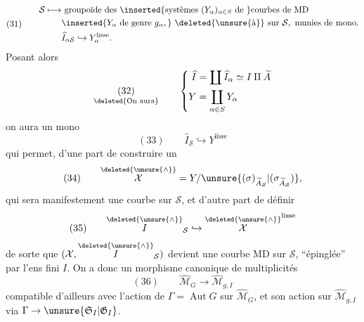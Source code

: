 \[
(31)\qquad\begin{aligned}
\mathcal S\longmapsto&\ \text{groupoïde des }\inserted{\text{systèmes }(Y_\alpha)_{\alpha\in S}\text{ de }}\text{courbes de MD}\\
&\inserted{Y_\alpha\text{ de genre }g_\alpha,}\ \text{\deleted{\unsure{à}} sur }\mathcal S,\text{ munies de mono.}\\
&\widehat I_{\alpha\mathcal S}\hookrightarrow Y_\alpha^{\text{lisse}}.
\end{aligned}
\]
Posant alors
\[
\underset{\text{\deleted{On aura}}}{(32)}\qquad\left\{\begin{aligned}
\widehat I&=\coprod\widehat I_\alpha\simeq I\amalg\widetilde A\\
Y&=\coprod_{\alpha\in S}Y_\alpha
\end{aligned}\right.
\]
on aura un mono
\[
(33)\qquad\widehat I_{\mathcal S}\hookrightarrow Y^{\text{lisse}}
\]
qui permet, d'une part de construire un
\[
(34)\qquad\overset{\deleted{\unsure{\wedge}}}{\mathcal X}=Y/\unsure{(\sigma)_{\widetilde A_{\mathcal S}}|(\sigma_{\widetilde A_{\mathcal S}})},
\]
qui sera manifestement une courbe  sur $\mathcal S$, et d'autre part de définir
\[
(35)\qquad\overset{\deleted{\unsure{\wedge}}}{I}_{\mathcal S}\hookrightarrow\overset{\deleted{\unsure{\wedge}}}{\mathcal X}^{\text{lisse}}
\]
de sorte que $(\mathcal X,\overset{\deleted{\unsure{\wedge}}}{I}_{\mathcal S})$ devient une courbe  MD sur $\mathcal S$, ``épinglée'' par l'ens fini $I$. On a donc un morphisme canonique de multiplicités
\[
(36)\qquad\widehat{\mathcal M}_G\longrightarrow\widehat{\mathcal M}_{g,I}
\]
compatible d'ailleurs avec l'action de $\Gamma=\operatorname{Aut}G$ sur $\widehat{\mathcal M}_G$, et son action sur $\widehat{\mathcal M}_{g,I}$ via $\Gamma\to\unsure{\mathfrak S_I|\mathfrak G_I}$.
